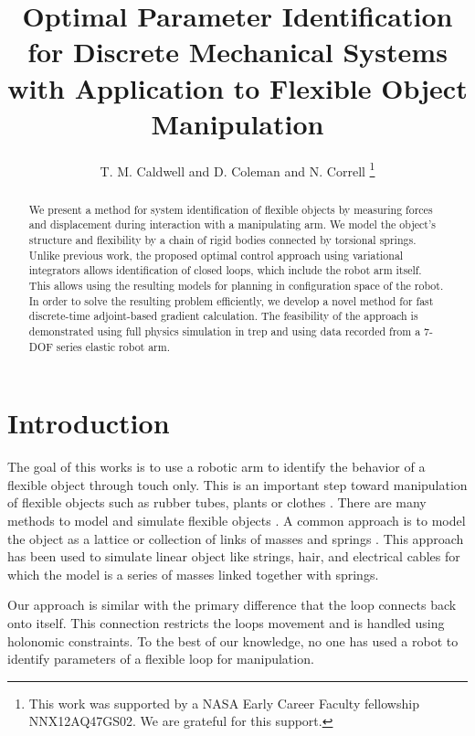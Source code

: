 \documentclass[letterpaper, 10pt, conference]{ieeeconf}
\title{Optimal Parameter Identification for Discrete Mechanical Systems with Application to Flexible Object Manipulation}
\author{T. M. Caldwell and  D. Coleman and N. Correll%
\thanks{
This work was supported by a NASA
Early Career Faculty fellowship NNX12AQ47GS02. We are grateful for this support.}%
}
\begin{document}
\maketitle

\begin{abstract}
We present a method for system identification of flexible objects by measuring forces and displacement during interaction with a manipulating arm. We model the object's structure and flexibility by a chain of rigid bodies connected by torsional springs. Unlike previous work, the proposed optimal control approach using variational integrators allows identification of closed loops, which include the robot arm itself. This allows using the resulting models for planning in configuration space of the robot. In order to solve the resulting problem efficiently, we develop a novel method for fast discrete-time adjoint-based gradient calculation. The feasibility of the approach is demonstrated using full physics simulation in trep and using data recorded from a 7-DOF series elastic robot arm.
\end{abstract}

\section{Introduction}
The goal of this works is to use a robotic arm to identify the behavior of a flexible object through touch only. This is an important step toward manipulation of flexible objects such as rubber tubes, plants or clothes \cite{wakamatsu2006knotting,saha2007manipulation,bell2010flexible,jimenez2012survey}.  
There are many methods to model and simulate flexible objects \cite{khalil_payeur, lang_etal}.  A common approach is to model the object as a lattice or collection of links of masses and springs \cite{sahari_etal, wakamatsu_etal, khalil_payeur}.  This approach has been used to simulate linear object like strings, hair, and electrical cables for which the model is a series of masses linked together with springs. %

Our approach is similar with the primary difference that the loop connects back onto itself.  This connection restricts the loops movement and is handled using holonomic constraints.  To the best of our knowledge, no one has used a robot to identify parameters of a flexible loop for manipulation.
\end{document}
